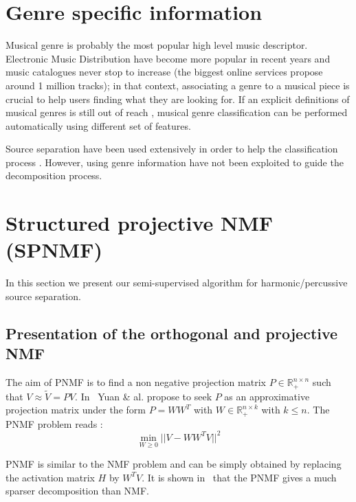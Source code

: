 \documentclass{article}
\begin{document}
\section{Genre specific information}\label{defgenre}



Musical genre is probably the most popular high level music descriptor. Electronic Music Distribution have become more popular in recent years and music catalogues never stop to increase (the biggest online services propose around 1 million tracks); in that context, associating a genre to a musical piece is crucial to help users finding what they are looking for. If an explicit definitions of musical genres is still out of reach \cite{aucouturier2003representing}, musical genre classification can be performed automatically using different set of features\cite{tzanetakis2002musical,mckay2006musical}. 

Source separation have been used extensively in order to help the classification process \cite{rump2010autoregressive,lampropoulos2005musical}. However, using genre information have not been exploited to guide the decomposition process. 




\section{Structured projective NMF (SPNMF)}
\label{sec:SPNMF}

In this section we present our semi-supervised algorithm for harmonic/percussive source separation.

\subsection{Presentation of the orthogonal and projective NMF}\label{subsec:PNMF}


The aim of PNMF is to find a non negative projection matrix $P \in \mathbb{R}_{+}^{n \times n}$ such that $V \approx \tilde{V} = PV$. In~\cite{yuanOja2005} Yuan \& al. propose to seek $P$ as an approximative projection matrix under the form $P = WW^{T}$ with $W \in \mathbb{R}_{+}^{n \times k}$ with $ k \leqslant n $. The PNMF problem reads : 
\begin{equation}\label{EqPnmf}
\min_{W \geqslant 0} ||V - WW^{T}V||^2 
\end{equation}

PNMF is similar to the NMF problem and can be simply obtained by replacing the activation matrix $H$ by $W^TV$. It is shown in~\cite{YangOja10} that the PNMF gives a much sparser decomposition than NMF.
\end{document}
